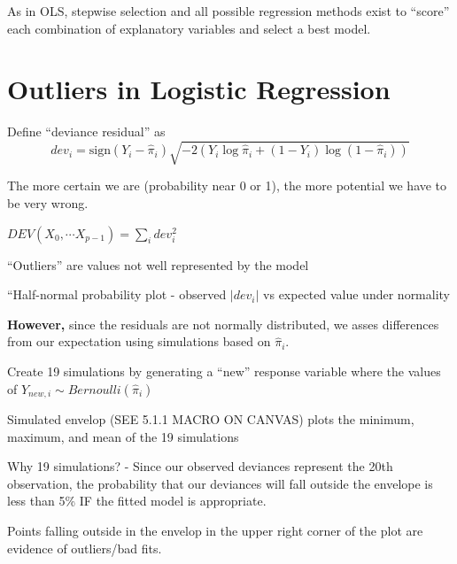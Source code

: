 \documentclass[12pt]{notes}
\begin{document}
\nspace
As in OLS, stepwise selection and all possible regression methods exist to ``score'' each combination of explanatory variables and select a best model. 



\section{Outliers in Logistic Regression}

\begin{minipage}[l][2cm][c]{\textwidth}

\end{minipage}

\bi
\item Define ``deviance residual'' as 
$$dev_i = \text{sign}(Y_i - \hat{\pi}_i)\sqrt{-2\left(Y_i\log\hat{\pi}_i + (1-Y_i)\log(1-\hat{\pi}_i)\right)}$$
\bi
\item The more certain we are (probability near 0 or 1), the more potential we have to be very wrong. 
\ei
\item $DEV(X_0, \cdots X_{p-1}) = \sum_i dev_i^2$
\item ``Outliers'' are values not well represented by the model
\item ``Half-normal probability plot - observed $|dev_i|$ vs expected value under normality
\bi
\item \textbf{However,} since the residuals are not normally distributed, we asses differences from our expectation using simulations based on $\hat{\pi}_i$. 
\bi
\item Create 19 simulations by generating a ``new'' response variable where the values of $Y_{new, i} \sim Bernoulli(\hat{\pi}_i)$
\ei
\item Simulated envelop (SEE 5.1.1 MACRO ON CANVAS) plots the minimum, maximum, and mean of the 19 simulations
\bi
\item Why 19 simulations? - Since our observed deviances represent the 20th observation, the probability that our deviances will fall outside the envelope is less than 5\% IF the fitted model is appropriate. 
\item Points falling outside in the envelop in the upper right corner of the plot are evidence of outliers/bad fits. 
\ei
\ei
\ei
\end{document}
